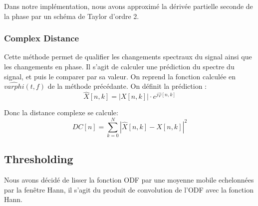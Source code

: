 \documentclass[]{article}
\begin{document}
Dans notre implémentation, nous avons approximé la dérivée partielle
seconde de la phase par un schéma de Taylor d'ordre 2.

\hypertarget{complex-distance}{%
\subsubsection{Complex Distance}\label{complex-distance}}

Cette méthode permet de qualifier les changements spectraux du signal
ainsi que les changements en phase. Il s'agit de calculer une prédiction
du spectre du signal, et puis le comparer par sa valeur. On reprend la
fonction calculée en \(\hat{varphi}(t, f)\) de la méthode précédante. On
définit la prédiction :
\[ \hat{X}[n, k] = \left\lvert X[n, k] \right\rvert \cdot e^{j\hat{\varphi}[n, k]} \]

Donc la distance complexe se calcule:
\[ DC[n] = \sum\limits_{k=0}^{N} \left\lvert  \hat{X}[n, k] - X[n, k] \right\rvert ^2 \]

\hypertarget{thresholding}{%
\subsection{Thresholding}\label{thresholding}}

Nous avons décidé de lisser la fonction ODF par une moyenne mobile
echelonnées par la fenêtre Hann, il s'agit du produit de convolution de
l'ODF avec la fonction Hann.
\end{document}
